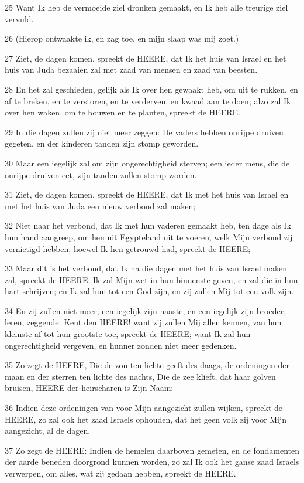 \par 25 Want Ik heb de vermoeide ziel dronken gemaakt, en Ik heb alle treurige ziel vervuld.
\par 26 (Hierop ontwaakte ik, en zag toe, en mijn slaap was mij zoet.)
\par 27 Ziet, de dagen komen, spreekt de HEERE, dat Ik het huis van Israel en het huis van Juda bezaaien zal met zaad van mensen en zaad van beesten.
\par 28 En het zal geschieden, gelijk als Ik over hen gewaakt heb, om uit te rukken, en af te breken, en te verstoren, en te verderven, en kwaad aan te doen; alzo zal Ik over hen waken, om te bouwen en te planten, spreekt de HEERE.
\par 29 In die dagen zullen zij niet meer zeggen: De vaders hebben onrijpe druiven gegeten, en der kinderen tanden zijn stomp geworden.
\par 30 Maar een iegelijk zal om zijn ongerechtigheid sterven; een ieder mens, die de onrijpe druiven eet, zijn tanden zullen stomp worden.
\par 31 Ziet, de dagen komen, spreekt de HEERE, dat Ik met het huis van Israel en met het huis van Juda een nieuw verbond zal maken;
\par 32 Niet naar het verbond, dat Ik met hun vaderen gemaakt heb, ten dage als Ik hun hand aangreep, om hen uit Egypteland uit te voeren, welk Mijn verbond zij vernietigd hebben, hoewel Ik hen getrouwd had, spreekt de HEERE;
\par 33 Maar dit is het verbond, dat Ik na die dagen met het huis van Israel maken zal, spreekt de HEERE: Ik zal Mijn wet in hun binnenste geven, en zal die in hun hart schrijven; en Ik zal hun tot een God zijn, en zij zullen Mij tot een volk zijn.
\par 34 En zij zullen niet meer, een iegelijk zijn naaste, en een iegelijk zijn broeder, leren, zeggende: Kent den HEERE! want zij zullen Mij allen kennen, van hun kleinste af tot hun grootste toe, spreekt de HEERE; want Ik zal hun ongerechtigheid vergeven, en hunner zonden niet meer gedenken.
\par 35 Zo zegt de HEERE, Die de zon ten lichte geeft des daags, de ordeningen der maan en der sterren ten lichte des nachts, Die de zee klieft, dat haar golven bruisen, HEERE der heirscharen is Zijn Naam:
\par 36 Indien deze ordeningen van voor Mijn aangezicht zullen wijken, spreekt de HEERE, zo zal ook het zaad Israels ophouden, dat het geen volk zij voor Mijn aangezicht, al de dagen.
\par 37 Zo zegt de HEERE: Indien de hemelen daarboven gemeten, en de fondamenten der aarde beneden doorgrond kunnen worden, zo zal Ik ook het ganse zaad Israels verwerpen, om alles, wat zij gedaan hebben, spreekt de HEERE.
